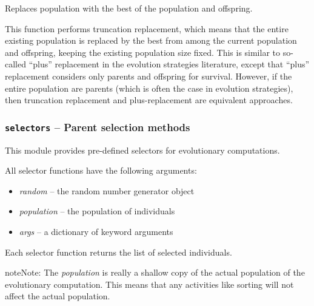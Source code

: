 \documentclass[letterpaper,10pt,english]{sphinxmanual}
\begin{document}

\begin{fulllineitems}
\label{reference:inspyred.ec.replacers.truncation_replacement}
Replaces population with the best of the population and offspring.

This function performs truncation replacement, which means that
the entire existing population is replaced by the best from among
the current population and offspring, keeping the existing population
size fixed. This is similar to so-called ``plus'' replacement in the 
evolution strategies literature, except that ``plus'' replacement 
considers only parents and offspring for survival. However, if the
entire population are parents (which is often the case in evolution 
strategies), then truncation replacement and plus-replacement are 
equivalent approaches.

\end{fulllineitems}

\label{reference:module-inspyred.ec.selectors}

\subsubsection{\texttt{selectors} -- Parent selection methods}
\label{reference:selectors-parent-selection-methods}
This module provides pre-defined selectors for evolutionary computations.

All selector functions have the following arguments:
\begin{itemize}
\item {} 
\emph{random} -- the random number generator object

\item {} 
\emph{population} -- the population of individuals

\item {} 
\emph{args} -- a dictionary of keyword arguments

\end{itemize}

Each selector function returns the list of selected individuals.

\begin{notice}{note}{Note:}
The \emph{population} is really a shallow copy of the actual population of
the evolutionary computation. This means that any activities like
sorting will not affect the actual population.
\end{notice}
\label{reference:module-selectors}
\end{document}
